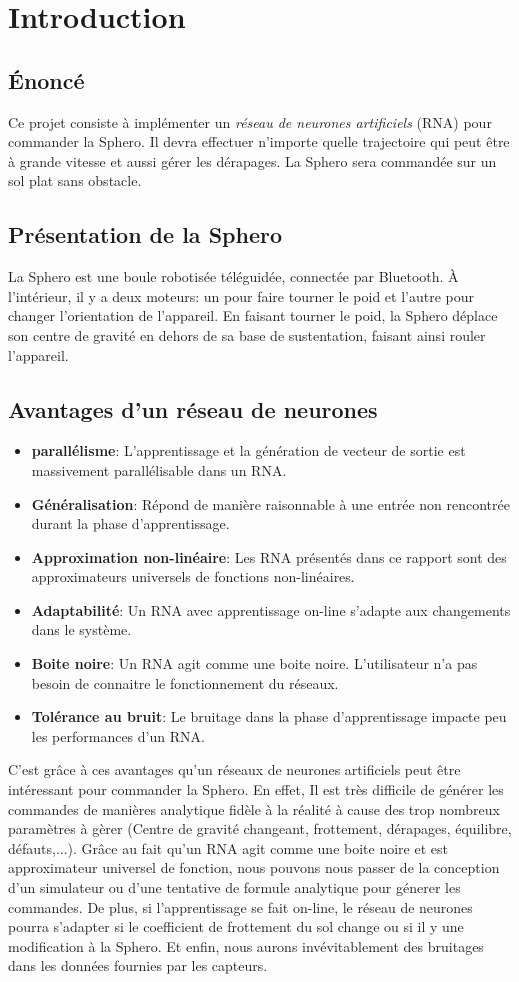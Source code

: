 \section{Introduction}
\subsection{Énoncé}
Ce projet consiste à implémenter un \emph{réseau de neurones artificiels} \hypertarget{rna}{(RNA)} pour commander la Sphero.
Il devra effectuer n'importe quelle trajectoire qui peut être à grande vitesse et aussi gérer les dérapages.
La Sphero sera commandée sur un sol plat sans obstacle.
\subsection{Présentation de la Sphero}
La Sphero est une boule robotisée téléguidée, connectée par Bluetooth.
À l'intérieur, il y a deux moteurs: un pour faire tourner le poid et l'autre pour changer l'orientation de l'appareil.
En faisant tourner le poid, la Sphero déplace son centre de gravité en dehors de sa base de sustentation, faisant ainsi rouler l'appareil.
\subsection{Avantages d'un réseau de neurones}
\begin{itemize}
 \item \textbf{parallélisme}: L'apprentissage et la génération de vecteur de sortie est massivement parallélisable dans un RNA.\cite{corelet,Haykin}
 \item \textbf{Généralisation}: Répond de manière raisonnable à une entrée non rencontrée durant la phase d'apprentissage.\cite{statistica,Haykin}
 \item \textbf{Approximation non-linéaire}: Les RNA présentés dans ce rapport sont des approximateurs universels de fonctions non-linéaires.\cite{Haykin}
 \item \textbf{Adaptabilité}: Un RNA avec apprentissage on-line s'adapte aux changements dans le système.\cite{Haykin}
 \item \textbf{Boite noire}: Un RNA agit comme une boite noire. L'utilisateur n'a pas besoin de connaitre le fonctionnement du réseaux.
 \item \textbf{Tolérance au bruit}: Le bruitage dans la phase d'apprentissage impacte peu les performances d'un RNA.\cite{Haykin}
\end{itemize}
C'est grâce à ces avantages qu'un réseaux de neurones artificiels peut être intéressant pour commander la Sphero.
En effet, Il est très difficile de générer les commandes de manières analytique fidèle à la réalité à cause des trop nombreux paramètres à gèrer (Centre de gravité changeant, frottement, dérapages, équilibre, défauts,...).
Grâce au fait qu'un RNA agit comme une boite noire et est approximateur universel de fonction, nous pouvons nous passer de la conception d'un simulateur ou d'une tentative de formule analytique pour génerer les commandes.
De plus, si l'apprentissage se fait on-line, le réseau de neurones pourra s'adapter si le coefficient de frottement du sol change ou si il y une modification à la Sphero.
Et enfin, nous aurons invévitablement des bruitages dans les données fournies par les capteurs.